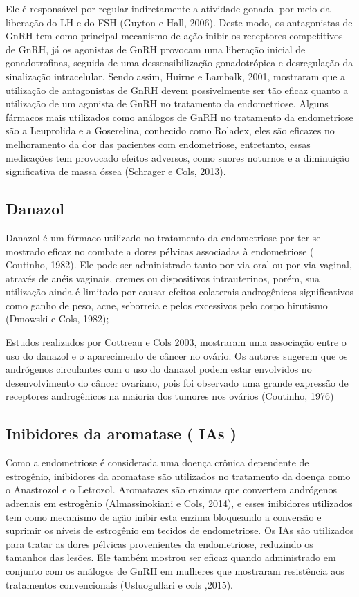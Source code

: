 \documentclass[12pt]{article} %
\begin{document}
Ele é responsável por regular indiretamente a atividade gonadal por
meio da liberação do LH e do FSH (Guyton e Hall, 2006). Deste modo, os
antagonistas de GnRH tem como principal mecanismo de ação inibir os
receptores competitivos de GnRH, já os agonistas de GnRH provocam uma
liberação inicial de gonadotrofinas, seguida de uma dessensibilização
gonadotrópica e desregulação da sinalização intracelular. Sendo assim,
Huirne e Lambalk, 2001, mostraram que a utilização de antagonistas de
GnRH devem possivelmente ser tão eficaz quanto a utilização de um
agonista de GnRH no tratamento da endometriose.  Alguns fármacos mais
utilizados como análogos de GnRH no tratamento da endometriose são a
Leuprolida e a Goserelina, conhecido como Roladex, eles são eficazes %
no melhoramento da dor das pacientes com endometriose, entretanto,
essas medicações tem provocado efeitos adversos, como suores noturnos
e a diminuição significativa de massa óssea (Schrager e Cols, 2013).

\subsection{Danazol}

Danazol é um fármaco utilizado no tratamento da endometriose por ter
se mostrado eficaz no combate a dores pélvicas associadas à
endometriose ( Coutinho, 1982). Ele pode ser administrado tanto por via oral ou por via
vaginal, através de anéis vaginais, cremes ou dispositivos
intrauterinos, porém, sua utilização ainda é limitado por causar
efeitos colaterais androgênicos significativos como ganho de peso,
acne, seborreia e pelos excessivos pelo corpo hirutismo (Dmowski e Cols, 1982);

Estudos realizados por Cottreau e Cols 2003, mostraram uma associação
entre o uso do danazol e o aparecimento de câncer no ovário. Os
autores sugerem que os andrógenos circulantes com o uso do danazol
podem estar envolvidos no desenvolvimento do câncer ovariano, pois foi
observado uma grande expressão de receptores androgênicos na maioria
dos tumores nos ovários (Coutinho, 1976)

\subsection{Inibidores da aromatase ( IAs )}

Como a endometriose é considerada uma doença crônica dependente de
estrogênio, inibidores da aromatase são utilizados no tratamento da
doença como o Anastrozol e o Letrozol. Aromatazes são enzimas que
convertem andrógenos adrenais em estrogênio (Almassinokiani e Cols,
2014), e esses inibidores utilizados tem como mecanismo de ação inibir
esta enzima bloqueando a conversão e suprimir os níveis de estrogênio
em tecidos de endometriose. Os IAs são utilizados para tratar as dores
pélvicas provenientes da endometriose, reduzindo os tamanhos das
lesões. Ele também mostrou ser eficaz quando administrado em conjunto
com os análogos de GnRH em mulheres que mostraram resistência aos
tratamentos convencionais (Usluogullari e cols ,2015).
\end{document}
